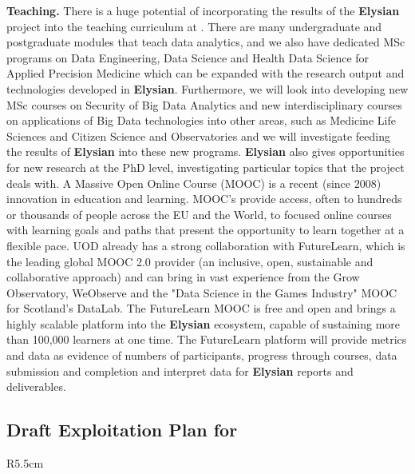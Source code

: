 \documentclass[a4paper,11pt]{article}
\newcommand{\project}[1]{\textbf{#1}\xspace}
\newcommand{\SECURITY}{\project{Elysian}}
\newcommand{\TheProject}{\SECURITY}
\begin{document}
\textbf{Teaching.} There is a huge potential of incorporating the results of the \TheProject{} project into the teaching curriculum at \UOD. There are many undergraduate and postgraduate modules that teach data analytics, and we also have dedicated MSc programs on Data Engineering, Data Science and Health Data Science for Applied Precision Medicine which can be expanded with the research output and technologies developed in \TheProject{}. Furthermore, we will look into developing new MSc courses on Security of Big Data Analytics and new interdisciplinary courses on applications of Big Data technologies into other areas, such as Medicine Life Sciences and Citizen Science and Observatories and we will investigate feeding the results of \TheProject{} into these new programs. \TheProject{} also gives opportunities for new research at the PhD level, investigating particular topics that the project deals with.
%
A Massive Open Online Course (MOOC)
is a recent (since 2008) innovation in education and learning. MOOC’s provide access, often to hundreds or thousands of people across the EU and the World, to focused online courses with learning goals and paths that present the opportunity to learn together at a flexible pace. UOD already has a strong collaboration with FutureLearn, which is the leading global MOOC 2.0 provider (an inclusive, open, sustainable and collaborative approach)  and can bring in vast experience from the Grow Observatory, WeObserve and the "Data Science in the Games Industry" MOOC for Scotland's DataLab.  The FutureLearn MOOC is free and open and brings a highly scalable platform into the \TheProject{} 
ecosystem, capable of sustaining more than 100,000 learners at one time. The FutureLearn platform will provide metrics and data as evidence of numbers of participants, progress through courses, data submission and completion and interpret data for \TheProject{} reports and deliverables.


\horizontalline

\subsection*{Draft Exploitation Plan for \UCMshort{}}

\begin{wrapfigure}{R}{5.5cm}
\vspace{-1cm}
\hfill {}
\vspace{-0.9cm}
\end{wrapfigure}
\end{document}
